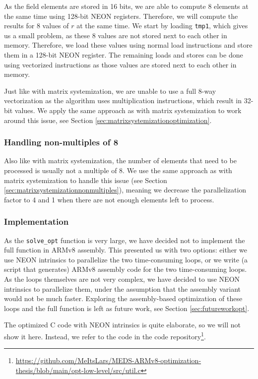 \documentclass[11pt,a4paper]{report}
\theoremstyle{definition}
\begin{document}
As the field elements are stored in 16 bits, we are able to compute 8 elements at the same time using 128-bit NEON registers. Therefore, we will compute the results for 8 values of $r$ at the same time. We start by loading \texttt{tmp1}, which gives us a small problem, as these 8 values are not stored next to each other in memory. Therefore, we load these values using normal load instructions and store them in a 128-bit NEON register. The remaining loads and stores can be done using vectorized instructions as those values are stored next to each other in memory.

Just like with matrix systemization, we are unable to use a full 8-way vectorization as the algorithm uses multiplication instructions, which result in 32-bit values. We apply the same approach as with matrix systemization to work around this issue, see Section \ref{sec:matrixsystemizationoptimization}.

\subsubsection{Handling non-multiples of 8}
Also like with matrix systemization, the number of elements that need to be processed is usually not a multiple of 8. We use the same approach as with matrix systemization to handle this issue (see Section \ref{sec:matrixsystemizationnonmultiples}), meaning we decrease the parallelization factor to 4 and 1 when there are not enough elements left to process.

\subsubsection{Implementation}
As the \texttt{solve\_opt} function is very large, we have decided not to implement the full function in ARMv8 assembly. This presented us with two options: either we use NEON intrinsics to parallelize the two time-consuming loops, or we write (a script that generates) ARMv8 assembly code for the two time-consuming loops. As the loops themselves are not very complex, we have decided to use NEON intrinsics to parallelize them, under the assumption that the assembly variant would not be much faster. Exploring the assembly-based optimization of these loops and the full function is left as future work, see Section \ref{sec:futureworkopt}.

The optimized C code with NEON intrinsics is quite elaborate, so we will not show it here. Instead, we refer to the code in the code repository\footnote{\url{https://github.com/MeItsLars/MEDS-ARMv8-optimization-thesis/blob/main/opt-low-level/src/util.c}}.
\end{document}
